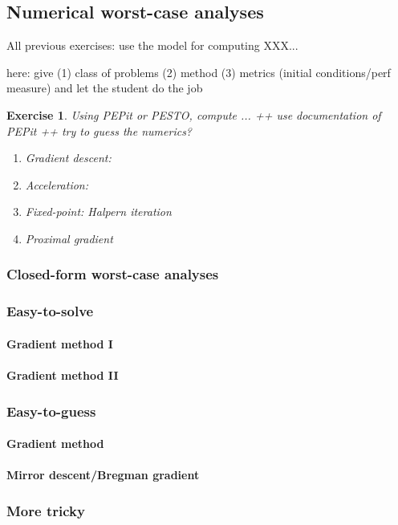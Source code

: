 \documentclass[11pt,a4paper]{article}
\newtheorem{exercise}{Exercise}
\begin{document}
	
	
	\subsection{Numerical worst-case analyses}
	All previous exercises: use the model for computing XXX... 
	
	here: give (1) class of problems (2) method (3) metrics (initial conditions/perf measure) and let the student do the job
	
	\begin{exercise}
	Using PEPit or PESTO, compute ... ++ use documentation of PEPit ++ try to guess the numerics?
	\begin{enumerate}
	\item Gradient descent:
	\item Acceleration:
	\item Fixed-point: Halpern iteration
	\item Proximal gradient
	\end{enumerate}
	\end{exercise}
	
	\subsubsection{Closed-form worst-case analyses}
	

	\subsubsection{Easy-to-solve}
	\paragraph{Gradient method I}
	\paragraph{Gradient method II}
	\subsubsection{Easy-to-guess}
	\paragraph{Gradient method}
	\paragraph{Mirror descent/Bregman gradient}
	\subsubsection{More tricky}
\end{document}

